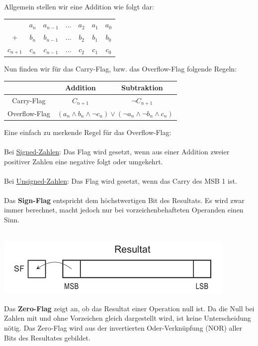 \documentclass[a4paper,10pt]{report}
\begin{document}
\noindent Allgemein stellen wir eine Addition wie folgt dar:
\begin{center}\begin{tabular}{ccccccc}
& $a_n$ & $a_{n-1}$ & $...$ & $a_2$ & $a_1$ & $a_0$ \\
+ & $b_n$ & $b_{n-1}$ & $...$ & $b_2$ & $b_1$ & $b_0$ \\ \hline
$c_{n+1}$ & $c_n$ & $c_{n-1}$ & $...$ & $c_2$ & $c_1$ & $c_0$
\end{tabular}\end{center}
Nun finden wir für das Carry-Flag, bzw. das Overflow-Flag folgende Regeln:
\begin{center}
\begin{tabular}{c|c|c|}
& Addition & Subtraktion \\ \hline
Carry-Flag & $C_{n+1}$ & $\lnot C_{n+1}$ \\ \hline
Overflow-Flag & \multicolumn{2}{|c|}{$(a_n \land b_n \land \lnot c_n) \lor (\lnot a_n \land \lnot b_n \land c_n)$} \\ \hline
\end{tabular}
\end{center}
Eine einfach zu merkende Regel für das Overflow-Flag: \\\\
Bei \underline{Signed-Zahlen}: Das Flag wird gesetzt, wenn aus einer Addition zweier positiver Zahlen eine negative folgt oder umgekehrt. \\\\
Bei \underline{Unsigned-Zahlen}: Das Flag wird gesetzt, wenn das Carry des MSB 1 ist.
\\\\
Das \textbf{Sign-Flag} entspricht dem höchstwertigen Bit des Resultats. Es wird zwar immer berechnet, macht jedoch nur bei vorzeichenbehafteten Operanden einen Sinn.\\\\
\begin{center}
\includegraphics[scale=0.7]{imgs/Sign.png}
\end{center}
Das \textbf{Zero-Flag} zeigt an, ob das Resultat einer Operation null ist. Da die Null bei Zahlen mit und ohne Vorzeichen gleich dargestellt wird, ist keine Unterscheidung nötig. Das Zero-Flag wird aus der invertierten Oder-Verknüpfung (NOR) aller Bits des Resultates gebildet. \\
\end{document}
